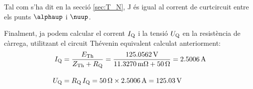\begin{exemple}
    Tal com s'ha dit en la secció \ref{sec:T_N}, J és igual al
    corrent de curtcircuit entre els punts $\alphaup$ i $\nuup$.

    Finalment, ja podem calcular el corrent $I_\mathrm{Q}$ i la tensió $U_\mathrm{Q}$ en la
    resistència de càrrega, utilitzant el circuit Thévenin equivalent calculat anteriorment:
    \begin{align*}
        I_\mathrm{Q} &= \frac{E_\mathrm{Th}}{Z_\mathrm{Th} + R_\mathrm{Q}} = \frac{\SI{125,0562}{V}}
        {\SI{11,3270}{m\ohm} + \SI{50}{\ohm}} = \SI{2,5006}{A} \\[2ex]
        U_\mathrm{Q} &=  R_\mathrm{Q} \,I_\mathrm{Q} = \SI{50}{\ohm} \times \SI{2,5006}{A} =
        \SI{125,03}{V}
    \end{align*}
\end{exemple}


